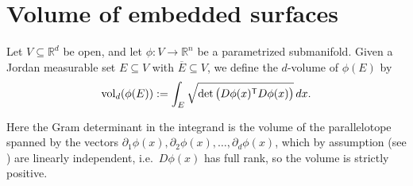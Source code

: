 
\section{Volume of embedded surfaces}
\label{sec:volume_embedded_surfaces}

\begin{definition}
\label{def:d_volume_parametrized_submanifold}
Let $V \subseteq \mathbb{R}^d$ be open, and let $\phi : V \to \mathbb{R}^n$ be a parametrized
submanifold. Given a Jordan measurable set $E \subseteq V$ with $\overline E \subseteq V$,
we define the $d$-volume of $\phi(E)$ by
\[\operatorname{vol}_d(\phi(E)) := \int_E \sqrt{\det\big(D\phi(x)^{\mathsf{T}} D\phi(x)\big)}\,dx.\]
\end{definition}

Here the Gram determinant in the integrand is the volume of the parallelotope spanned by the
vectors $\partial_1\phi(x),\partial_2\phi(x),\dots,\partial_d\phi(x)$, which by assumption
(see ) are linearly independent, i.e.\ $D\phi(x)$ has full rank,
so the volume is strictly positive.

